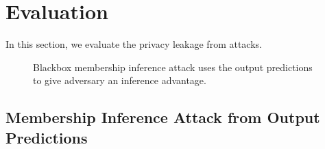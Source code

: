\section{Evaluation}\label{evaluation}

In this section, we evaluate the privacy leakage from attacks.

\begin{figure}[t]
    \centering
    \begin{minipage}[b]{1\linewidth}
    \centering
    \end{minipage}
    \caption{Blackbox membership inference attack uses the output predictions to give adversary an inference advantage.}
    \label{fig:NIA}
\end{figure}

\subsection{Membership Inference Attack from Output Predictions}



